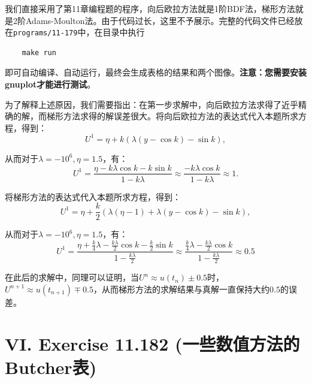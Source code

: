 \documentclass[twoside,a4paper]{article}
\begin{document}
我们直接采用了第11章编程题的程序，向后欧拉方法就是1阶BDF法，梯形方法就是2阶Adams-Moulton法。由于代码过长，这里不予展示。完整的代码文件已经放在\verb|programs/11-179|中，在目录中执行
\begin{lstlisting}
    make run
\end{lstlisting}

即可自动编译、自动运行，最终会生成表格的结果和两个图像。\textbf{注意：您需要安装gnuplot才能进行测试}。

为了解释上述原因，我们需要指出：在第一步求解中，向后欧拉方法求得了近乎精确的解，而梯形方法求得的解误差很大。将向后欧拉方法的表达式代入本题所求方程，得到：
\begin{equation*}
    U^1=\eta+k(\lambda(y-\cos k)-\sin k),
\end{equation*}

从而对于$\lambda=-10^6,\eta=1.5$，有：
\begin{equation*}
    U^1= \frac{\eta-k\lambda\cos k - k\sin k}{1-k\lambda}\approx \frac{-k\lambda\cos k}{1-k\lambda} \approx 1.
\end{equation*}

将梯形方法的表达式代入本题所求方程，得到：
\begin{equation*}
    U^1=\eta+\frac{k}{2}(\lambda(\eta-1)+\lambda(y-\cos k)-\sin k),
\end{equation*}

从而对于$\lambda=-10^6,\eta=1.5$，有：
\begin{equation*}
    U^1= \frac{\eta+\frac{k}{4}\lambda-\frac{k\lambda}{2}\cos k-\frac{k}{2}\sin k}{1-\frac{k\lambda}{2}}\approx \frac{\frac{k}{4}\lambda-\frac{k\lambda}{2}\cos k}{1-\frac{k\lambda}{2}}\approx 0.5
\end{equation*}

在此后的求解中，同理可以证明，当$U^n\approx u(t_n)\pm0.5$时，$U^{n+1}\approx u(t_{n+1})\mp0.5$，从而梯形方法的求解结果与真解一直保持大约$0.5$的误差。

\section*{VI. Exercise 11.182 (一些数值方法的Butcher表)}
\end{document}
